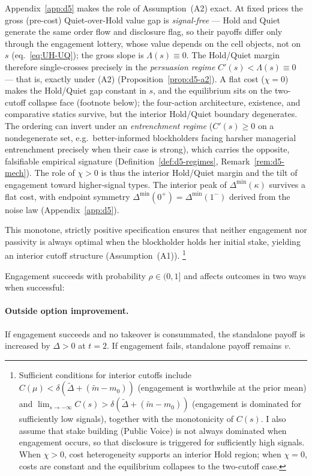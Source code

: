 \documentclass[11pt]{article}
\newcommand{\1}{\mathbf{1}}
\begin{document}
Appendix~\ref{app:d5} makes the role of Assumption~\textup{(A2)} exact. At fixed prices the gross (pre-cost) Quiet-over-Hold value gap is \emph{signal-free} --- Hold and Quiet generate the same order flow and disclosure flag, so their payoffs differ only through the engagement lottery, whose value depends on the cell objects, not on $s$ (eq.~\eqref{eq:UH-UQ}); the gross slope is $\Lambda(s)\equiv0$. The Hold/Quiet margin therefore single-crosses precisely in the \emph{persuasion regime} $C'(s)<\Lambda(s)\equiv0$ --- that is, exactly under \textup{(A2)} (Proposition~\ref{prop:d5-a2}). A flat cost ($\chi=0$) makes the Hold/Quiet gap constant in $s$, and the equilibrium sits on the two-cutoff collapse face (footnote below); the four-action architecture, existence, and comparative statics survive, but the interior Hold/Quiet boundary degenerates. The ordering can invert under an \emph{entrenchment regime} ($C'(s)\ge0$ on a nondegenerate set, e.g.\ better-informed blockholders facing harsher managerial entrenchment precisely when their case is strong), which carries the opposite, falsifiable empirical signature (Definition~\ref{def:d5-regimes}, Remark~\ref{rem:d5-mech}). The role of $\chi>0$ is thus the interior Hold/Quiet margin and the tilt of engagement toward higher-signal types. The interior peak of $\Delta^{\min}(\kappa)$ survives a flat cost, with endpoint symmetry $\Delta^{\min}(0^+)=\Delta^{\min}(1^-)$ derived from the noise law (Appendix~\ref{app:d5}).

This monotone, strictly positive specification ensures that neither engagement nor passivity is always optimal when the blockholder holds her initial stake, yielding an interior cutoff structure (Assumption~\textup{(A1)}).%
\footnote{Sufficient conditions for interior cutoffs include $C(\mu) < \delta(\tilde{\Delta} + (\tilde{m}-m_0))$ (engagement is worthwhile at the prior mean) and $\lim_{s\to-\infty} C(s) > \delta(\tilde{\Delta} + (\tilde{m}-m_0))$ (engagement is dominated for sufficiently low signals), together with the monotonicity of $C(s)$. I also assume that stake building (Public Voice) is not always dominated when engagement occurs, so that disclosure is triggered for sufficiently high signals. When $\chi > 0$, cost heterogeneity supports an interior Hold region; when $\chi = 0$, costs are constant and the equilibrium collapses to the two-cutoff case.}

Engagement succeeds with probability $\rho \in (0,1]$ and affects outcomes in two ways when successful:

\paragraph{Outside option improvement.} If engagement succeeds and no takeover is consummated, the standalone payoff is increased by $\Delta > 0$ at $t=2$. If engagement fails, standalone payoff remains $v$.
\end{document}
